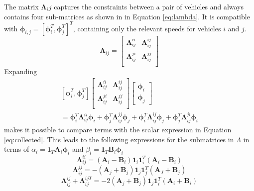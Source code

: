 \documentclass[]{article}
\begin{document}
The matrix $\bm{\Lambda}_ij$ captures the constraints between a pair of vehicles and always contains four sub-matrices as shown in in Equation \ref{eq:lambda}. It is compatible with $\bm{\phi}_{i,j} = [\bm{\phi}_i^T, \bm{\phi}_j^T]^T$, containing only the relevant speeds for vehicles $i$ and $j$. 
\begin{equation}
	\bm{\Lambda}_{ij} =\left[
	\begin{array}{cc}
		\bm{\Lambda}_{ij}^{ii} & \bm{\Lambda}_{ij}^{ij} \\
		\bm{\Lambda}_{ij}^{ji} & \bm{\Lambda}_{ij}^{jj} \\
	\end{array}
	\right]
	\label{eq:lambda}
\end{equation}
Expanding 
\begin{multline}
	\left[\bm{\phi}_i^T, \bm{\phi}_j^T\right]
	\left[\begin{array}{cc}
		\bm{\Lambda}_{ij}^{ii} & \bm{\Lambda}_{ij}^{ij} \\
		\bm{\Lambda}_{ij}^{ji} & \bm{\Lambda}_{ij}^{jj} \\
	\end{array}\right]
	\left[\begin{array}{c}
		\bm{\phi}_i\\
		\bm{\phi}_j \end{array} \right] \\
	= \bm{\phi}_{i}^T \bm{\Lambda}_{ij}^{ii} \bm{\phi}_{i} + \bm{\phi}_{j}^T \bm{\Lambda}_{ij}^{jj} \bm{\phi}_{j} + \bm{\phi}_{i}^T \bm{\Lambda}_{ij}^{ij} \bm{\phi}_{j} + \bm{\phi}_{j}^T \bm{\Lambda}_{ij}^{ji} \bm{\phi}_{i}
\end{multline}
makes it possible to compare terms with the scalar expression in Equation \ref{eq:collected}. This leads to the following expressions for the submatrices in $\Lambda$ in terms of $\alpha_i = \bm{1}_T\bm{A}_i\bm{\phi}_i$ and $\beta_i = \bm{1}_T\bm{B}_i\bm{\phi}_i$ 
\begin{equation}
	\bm{\Lambda}_{ij}^{ii} = (\bm{A}_i - \bm{B}_i)\bm{1}_i\bm{1}_i^T(\bm{A}_i - \bm{B}_i) 
	\label{eq:ii}
\end{equation}
\begin{equation}
	\bm{\Lambda}_{ij}^{jj} = -(\bm{A}_j + \bm{B}_j)\bm{1}_j\bm{1}_j^T(\bm{A}_J + \bm{B}_j) 
	\label{eq:jj}
\end{equation}
\begin{equation}
	\bm{\Lambda}_{ij}^{ij} + \bm{\Lambda}_{ij}^{ij T} = -2(\bm{A}_j + \bm{B}_j)\bm{1}_j\bm{1}_i^T(\bm{A}_i + \bm{B}_i) 
	\label{eq:ij}
\end{equation}
\end{document}
